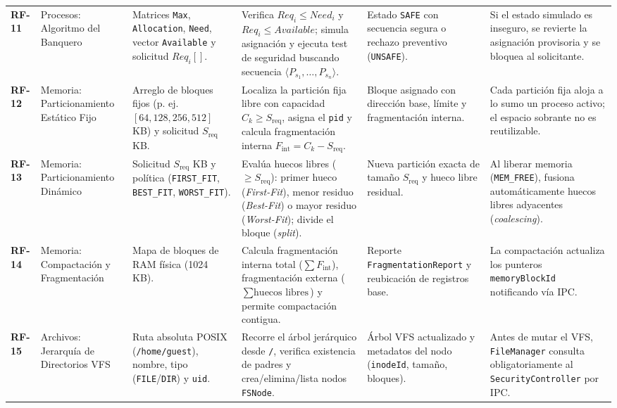 \documentclass[10pt,twocolumn,letterpaper]{article}
\begin{document}
\begin{table}[!t]
\begin{tabularx}{\textwidth}{C{0.9cm} L{2.2cm} L{2.8cm} Y L{2.8cm} L{3.3cm}}
\textbf{RF-11} & Procesos: Algoritmo del Banquero & Matrices \texttt{Max}, \texttt{Allocation}, \texttt{Need}, vector \texttt{Available} y solicitud $Req_i[]$. & Verifica $Req_i \le Need_i$ y $Req_i \le Available$; simula asignaci\'on y ejecuta test de seguridad buscando secuencia $\langle P_{s_1}, \dots, P_{s_n} \rangle$. & Estado \texttt{SAFE} con secuencia segura o rechazo preventivo (\texttt{UNSAFE}). & Si el estado simulado es inseguro, se revierte la asignaci\'on provisoria y se bloquea al solicitante. \\
\textbf{RF-12} & Memoria: Particionamiento Est\'atico Fijo & Arreglo de bloques fijos (p. ej. $[64, 128, 256, 512]$ KB) y solicitud $S_{\text{req}}$ KB. & Localiza la partici\'on fija libre con capacidad $C_k \ge S_{\text{req}}$, asigna el \texttt{pid} y calcula fragmentaci\'on interna $F_{\text{int}} = C_k - S_{\text{req}}$. & Bloque asignado con direcci\'on base, l\'imite y fragmentaci\'on interna. & Cada partici\'on fija aloja a lo sumo un proceso activo; el espacio sobrante no es reutilizable. \\
\textbf{RF-13} & Memoria: Particionamiento Din\'amico & Solicitud $S_{\text{req}}$ KB y pol\'itica (\texttt{FIRST\_FIT}, \texttt{BEST\_FIT}, \texttt{WORST\_FIT}). & Eval\'ua huecos libres ($\ge S_{\text{req}}$): primer hueco (\textit{First-Fit}), menor residuo (\textit{Best-Fit}) o mayor residuo (\textit{Worst-Fit}); divide el bloque (\textit{split}). & Nueva partici\'on exacta de tama\~no $S_{\text{req}}$ y hueco libre residual. & Al liberar memoria (\texttt{MEM\_FREE}), fusiona autom\'aticamente huecos libres adyacentes (\textit{coalescing}). \\
\textbf{RF-14} & Memoria: Compactaci\'on y Fragmentaci\'on & Mapa de bloques de RAM física (1024 KB). & Calcula fragmentaci\'on interna total ($\sum F_{\text{int}}$), fragmentaci\'on externa ($\sum \text{huecos libres}$) y permite compactaci\'on contigua. & Reporte \texttt{FragmentationReport} y reubicaci\'on de registros base. & La compactaci\'on actualiza los punteros \texttt{memoryBlockId} notificando v\'ia IPC. \\
\textbf{RF-15} & Archivos: Jerarqu\'ia de Directorios VFS & Ruta absoluta POSIX (\texttt{/home/guest}), nombre, tipo (\texttt{FILE}/\texttt{DIR}) y \texttt{uid}. & Recorre el \'arbol jer\'arquico desde \texttt{/}, verifica existencia de padres y crea/elimina/lista nodos \texttt{FSNode}. & \'Arbol VFS actualizado y metadatos del nodo (\texttt{inodeId}, tama\~no, bloques). & Antes de mutar el VFS, \texttt{FileManager} consulta obligatoriamente al \texttt{SecurityController} por IPC. \\
\bottomrule
\end{tabularx}
\end{table}
\end{document}
